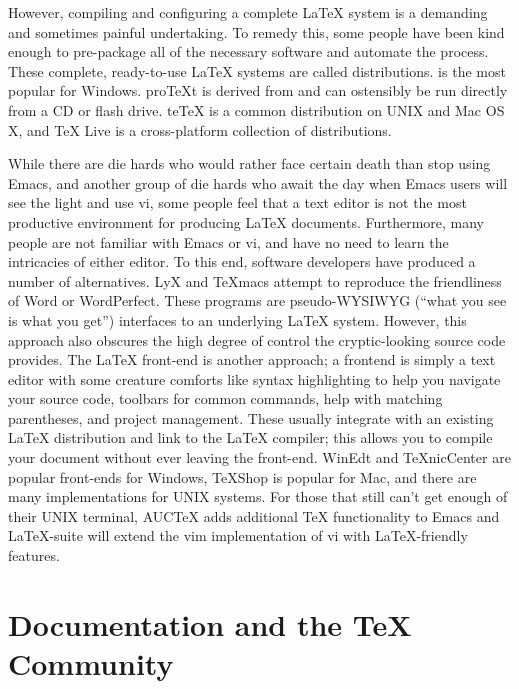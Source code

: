 However, compiling and configuring a complete \LaTeX{} system is a
demanding and sometimes painful undertaking.  To remedy this, some
people have been kind enough to pre-package all of the necessary
software and automate the process.  These complete, ready-to-use
\LaTeX{} systems are called distributions.  \MiKTeX{} is the most
popular for Windows.  pro\TeX{t} is derived from \MiKTeX{} and can
ostensibly be run directly from a CD or flash drive.  te\TeX{} is a
common distribution on UNIX and Mac OS X, and \TeX{} Live is a
cross-platform collection of distributions.

While there are die hards who would rather face certain death than
stop using Emacs, and another group of die hards who await the day
when Emacs users will see the light and use vi, some people feel that
a text editor is not the most productive environment for producing
\LaTeX{} documents.  Furthermore, many people are not familiar with
Emacs or vi, and have no need to learn the intricacies of either
editor.  To this end, software developers have produced a number of
alternatives.  LyX and \TeX{macs} attempt to reproduce the
friendliness of Word or WordPerfect.  These programs are
pseudo-WYSIWYG (``what you see is what you get'') interfaces to an
underlying \LaTeX{} system.  However, this approach also obscures the
high degree of control the cryptic-looking source code provides.  The
\LaTeX{} front-end is another approach; a frontend is simply a text
editor with some creature comforts like syntax highlighting to help
you navigate your source code, toolbars for common commands, help with
matching parentheses, and project management.  These usually integrate
with an existing \LaTeX{} distribution and link to the \LaTeX{}
compiler; this allows you to compile your document without ever
leaving the front-end.  WinEdt and \TeX{nicCenter} are popular
front-ends for Windows, \TeX{Shop} is popular for Mac, and there are
many implementations for UNIX systems.  For those that still can't get
enough of their UNIX terminal, AUC\TeX{} adds additional \TeX{}
functionality to Emacs and \LaTeX{}-suite will extend the vim
implementation of vi with \LaTeX{}-friendly features.

\section{Documentation and the \TeX{} Community}
\label{sec:docum-tex-comm}

